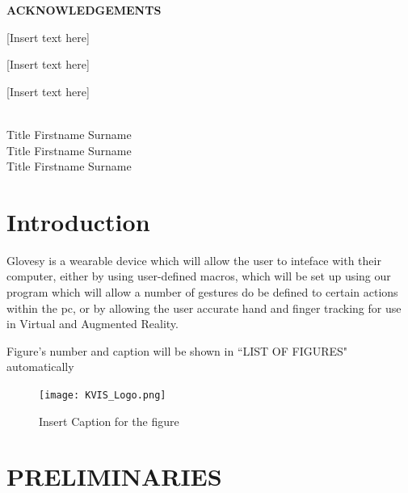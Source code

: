 \documentclass[12pt,a4paper,oneside]{book}
\theoremstyle{plain}
\numberwithin{equation}{chapter} \DeclareMathOperator{\Var}{Var}
\renewcommand{\contentsname}{\hfill\bfseries\Large TABLE OF CONTENTS \hfill}
\begin{document}
\newpage
\begin{center}
	\large{\textbf{ACKNOWLEDGEMENTS}} \\
\end{center}

[Insert text here]

[Insert text here]

[Insert text here]\\\\

\begin{flushright}
    Title Firstname Surname\\
    Title Firstname Surname\\
    Title Firstname Surname\\
\end{flushright}


\newpage

\tableofcontents
%


\newpage
{}
\listoffigures

\newpage
{}
\listoftables


\newpage
{}
\chapter*{Introduction}

\indent Glovesy is a wearable device which will allow the user to inteface with their computer, either by using user-defined macros, which will be set up using our program which will allow a number of gestures do be defined to certain actions within the pc, or by allowing the user accurate hand and finger tracking for use in Virtual and Augmented Reality.

\vspace{2cm}

\noindent Figure's number and caption will be shown in ``LIST OF FIGURES" automatically
\begin{figure}[H]
	\texttt{[image: KVIS\_Logo.png]}
	\centering
	\caption{Insert Caption for the figure}\label{fig1}
\end{figure}

\chapter*{PRELIMINARIES}
\end{document}

